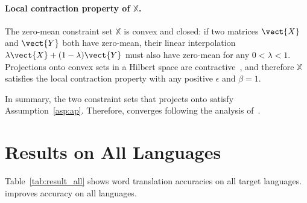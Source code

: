\paragraph{Local contraction property of $\mathbb{X}$.}
The zero-mean constraint set $\mathbb{X}$ is convex and closed: if two
matrices $\vect{X}$ and $\vect{Y}$ both have zero-mean, their linear
interpolation $\lambda \vect{X} + (1 - \lambda) \vect{Y}$ must also have
zero-mean for any $0 < \lambda < 1$.
Projections onto convex sets in a Hilbert space are
contractive~\cite{browder-67}, and therefore $\mathbb{X}$ satisfies the local
contraction property with any positive $\epsilon$ and $\beta = 1$.

In summary, the two constraint sets that \name{} projects onto satisfy
Assumption~\ref{asp:ap}.  Therefore, \name{} converges following the analysis 
of~\citet{zhu2018convergence}.

\section{Results on All Languages}\label{sec:result_all}

Table~\ref{tab:result_all} shows word translation accuracies on all target
languages.  \name{} improves accuracy on all languages.

